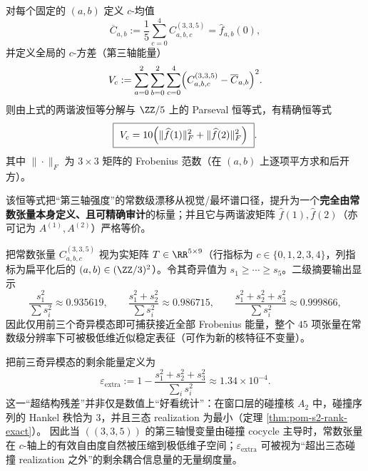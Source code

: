 \begin{remark}\label{thm:arity-335-c-variance-identity}
对每个固定的 \((a,b)\) 定义 \(c\)-均值
\[
\overline C_{a,b}:=\frac{1}{5}\sum_{c=0}^{4}C^{(3,3,5)}_{a,b,c}
=\widehat f_{a,b}(0),
\]
并定义全局的 \(c\)-方差（第三轴能量）
\[
V_c:=\sum_{a=0}^{2}\sum_{b=0}^{2}\sum_{c=0}^{4}\Bigl(C^{(3,3,5)}_{a,b,c}-\overline C_{a,b}\Bigr)^2.
\]
则由上式的两谐波恒等分解与 \(\ZZ/5\) 上的 Parseval 恒等式，有精确恒等式
\[
\boxed{\ 
V_c
=10\Bigl(\|\widehat f(1)\|_F^2+\|\widehat f(2)\|_F^2\Bigr)
\ }.
\]
其中 \(\|\cdot\|_F\) 为 \(3\times 3\) 矩阵的 Frobenius 范数（在 \((a,b)\) 上逐项平方求和后开方）。
\par
该恒等式把“第三轴强度”的常数级漂移从视觉/最坏谱口径，提升为一个\textbf{完全由常数张量本身定义、且可精确审计}的标量；并且它与两谐波矩阵 \(\widehat f(1),\widehat f(2)\)（亦可记为 \(A^{(1)},A^{(2)}\)）严格等价。
\end{remark}

\begin{remark}\label{prop:arity-335-low-rank}
把常数张量 $C^{(3,3,5)}_{a,b,c}$ 视为实矩阵 $T\in\RR^{5\times 9}$（行指标为 $c\in\{0,1,2,3,4\}$，列指标为扁平化后的 $(a,b)\in(\ZZ/3)^2$）。令其奇异值为 $s_1\ge \cdots\ge s_5$。二级摘要输出显示
\[
\frac{s_1^2}{\sum s_i^2}\approx 0.935619,\qquad
\frac{s_1^2+s_2^2}{\sum s_i^2}\approx 0.986715,\qquad
\frac{s_1^2+s_2^2+s_3^2}{\sum s_i^2}\approx 0.999866,
\]
因此仅用前三个奇异模态即可捕获接近全部 Frobenius 能量，整个 $45$ 项张量在常数级分辨率下可被极低维近似稳定表征（可作为新的核特征不变量）。
\end{remark}

\begin{remark}\label{rem:arity-335-low-rank-vs-hankel}
把前三奇异模态的剩余能量定义为
\[
\varepsilon_{\mathrm{extra}}
:=1-\frac{s_1^2+s_2^2+s_3^2}{\sum_i s_i^2}\approx 1.34\times 10^{-4}.
\]
这一“超结构残差”并非仅是数值上“好看统计”：在窗口层的碰撞核 \(A_2\) 中，碰撞序列的 Hankel 秩恰为 \(3\)，并且三态 realization 为最小（定理 \ref{thm:pom-s2-rank-exact}）。
因此当 \(((3,3,5))\) 的第三轴慢变量由碰撞 cocycle 主导时，常数张量在 \(c\)-轴上的有效自由度自然被压缩到极低维子空间；\(\varepsilon_{\mathrm{extra}}\) 可被视为“超出三态碰撞 realization 之外”的剩余耦合信息量的无量纲度量。
\end{remark}

